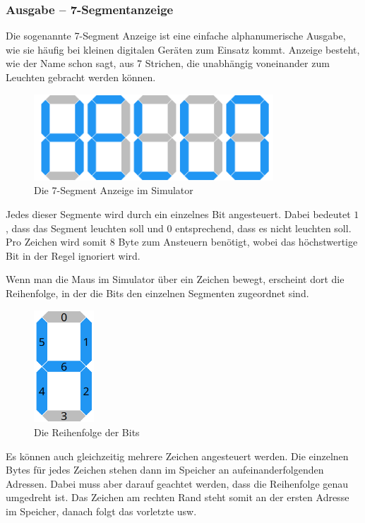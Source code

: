 \subsubsection{Ausgabe -- 7-Segmentanzeige}
Die sogenannte 7-Segment Anzeige ist eine einfache alphanumerische Ausgabe,
wie sie häufig bei kleinen digitalen Geräten zum Einsatz kommt.
Anzeige besteht, wie der Name schon sagt, aus 7 Strichen, die unabhängig voneinander zum Leuchten gebracht werden können.

\begin{figure}[ht]
	\centering
  \includegraphics[width=0.8\textwidth]{Images/7-Segment_Hello}
	\caption{Die 7-Segment Anzeige im Simulator}
	\label{7-Segment}
\end{figure}

Jedes dieser Segmente wird durch ein einzelnes Bit angesteuert. Dabei bedeutet $1$, dass das Segment leuchten soll und $0$ entsprechend, dass es nicht leuchten soll.
Pro Zeichen wird somit 8 Byte zum Ansteuern benötigt, wobei das höchstwertige Bit in der Regel ignoriert wird.

Wenn man die Maus im Simulator über ein Zeichen bewegt, erscheint dort die Reihenfolge, in der die Bits den einzelnen Segmenten zugeordnet sind.

\begin{figure}[ht]
	\centering
  \includegraphics[width=0.2\textwidth]{Images/7-Segment_Hover}
	\caption{Die Reihenfolge der Bits}
	\label{7-Segment_Hover}
\end{figure}

Es können auch gleichzeitig mehrere Zeichen angesteuert werden. Die einzelnen Bytes für jedes Zeichen stehen dann im Speicher an aufeinanderfolgenden Adressen.
Dabei muss aber darauf geachtet werden, dass die Reihenfolge genau umgedreht ist. Das Zeichen am rechten Rand steht somit an der ersten Adresse im Speicher,
danach folgt das vorletzte usw.

